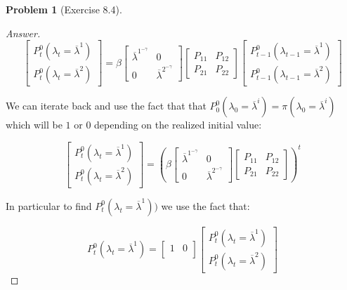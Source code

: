 \documentclass[12pt]{article}
\theoremstyle{definition}
\newtheorem{problem}{Problem}
\begin{document}
\begin{problem}[Exercise 8.4]
\begin{proof}[Answer]
$$
\left[
\begin{array}{c}
    P_t^{0}(\lambda_t=\overline{\lambda}^1) \\
    P_t^{0}(\lambda_t=\overline{\lambda}^2)
\end{array}
\right]= \beta
\left[
\begin{array}{cc}
    \overline{\lambda}^1^{-\gamma} & 0 \\
    0 & \overline{\lambda}^2^{-\gamma}  
\end{array}
\right]
\left[
\begin{array}{cc}
    P_{11} & P_{12} \\
    P_{21} & P_{22}
\end{array}
\right]
\left[
\begin{array}{c}
    P_{t-1}^{0}(\lambda_{t-1}=\overline{\lambda}^1) \\
    P_{t-1}^{0}(\lambda_{t-1}=\overline{\lambda}^2)
\end{array}
\right]
$$

We can iterate back and use the fact that that $P_0^{0}(\lambda_0=\overline{\lambda}^i) = \pi(\lambda_0=\overline{\lambda}^i)$ which will be $1$ or $0$ depending on the realized initial value:

$$
\left[
\begin{array}{c}
    P_t^{0}(\lambda_t=\overline{\lambda}^1) \\
    P_t^{0}(\lambda_t=\overline{\lambda}^2)
\end{array}
\right]= \left(\beta
\left[
\begin{array}{cc}
    \overline{\lambda}^1^{-\gamma} & 0 \\
    0 & \overline{\lambda}^2^{-\gamma}  
\end{array}
\right]
\left[
\begin{array}{cc}
    P_{11} & P_{12} \\
    P_{21} & P_{22}
\end{array}
\right]
\right)^t
$$

In particular to find $ P_t^{0}(\lambda_t=\overline{\lambda}^1))$ we use the fact that:

$$ P_t^{0}(\lambda_t=\overline{\lambda}^1) = \left[\begin{array}{cc}
    1 & 0 \\
\end{array}\right] \left[
\begin{array}{c}
    P_t^{0}(\lambda_t=\overline{\lambda}^1) \\
    P_t^{0}(\lambda_t=\overline{\lambda}^2)
\end{array}
\right]$$


\end{proof}
\end{problem}
\end{document}
